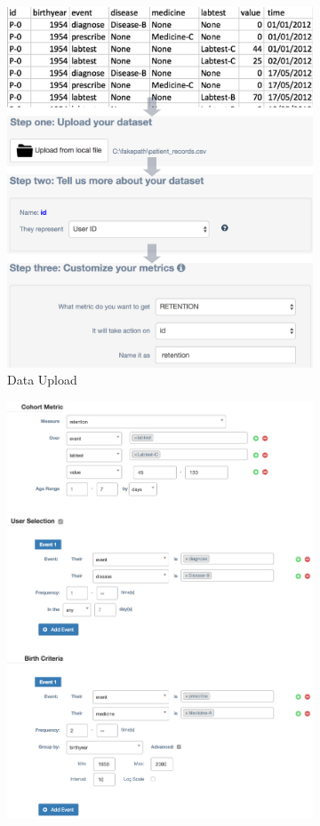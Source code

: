 \documentclass[10pt,conference,letterpaper]{IEEEtran}
\begin{document}
\begin{figure}
\begin{subfigure}{0.3\textwidth}
    \centering
    \includegraphics[width=0.9\linewidth]{upload_all_vertical.png}
    \caption{Data Upload}
    \label{fig:upload}
\end{subfigure}%
\begin{subfigure}{0.4\textwidth}
    \centering
    \includegraphics[width=0.9\linewidth]{query.png}

\end{subfigure}
\end{figure}
\end{document}
